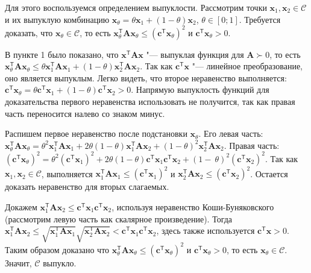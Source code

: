 \documentclass[a4paper,12pt]{article}
\begin{document}
\begin{enumerate}
		Для этого воспользуемся определением выпуклости. Рассмотрим точки $\mathbf{x}_1, \mathbf{x}_2 \in \mathcal{C}$ и их выпуклую комбинацию $\mathbf{x}_\theta = \theta \mathbf{x}_1 + (1-\theta) \mathbf{x}_2$, $\theta\in[0;1]$. Требуется доказать, что $\mathbf{x}_\theta \in \mathcal{C}$, то есть $\mathbf{x}_\theta^\mathsf{T} \mathbf{A} \mathbf{x}_\theta \leqslant (\mathbf{c}^\mathsf{T} \mathbf{x}_\theta)^2 $ и $\mathbf{c}^\mathsf{T} \mathbf{x}_\theta > 0$.
		
		В пункте 1 было показано, что $\mathbf{x}^\mathsf{T} \mathbf{A} \mathbf{x}$ "--- выпуклая функция для $\mathbf{A} \succ 0$, то есть $\mathbf{x}_\theta^\mathsf{T} \mathbf{A} \mathbf{x}_\theta \leqslant \theta \mathbf{x}_1^\mathsf{T} \mathbf{A} \mathbf{x}_1 + (1 - \theta) \mathbf{x}_2^\mathsf{T} \mathbf{A} \mathbf{x}_2$. Так как $ \mathbf{c}^\mathsf{T} \mathbf{x}$ "--- линейное преобразование, оно является выпуклым. Легко видеть, что второе неравенство выполняется: $\mathbf{c}^\mathsf{T} \mathbf{x}_\theta = \theta \mathbf{c}^\mathsf{T} \mathbf{x}_1 + (1-\theta) \mathbf{c}^\mathsf{T} \mathbf{x}_2> 0$. Напрямую выпуклость функций для доказательства первого неравенства использовать не получится, так как правая часть переносится налево со знаком минус.
		
		Распишем первое неравенство после подстановки $\mathbf{x}_\theta$. 
		Его левая часть: $\mathbf{x}_\theta^\mathsf{T} \mathbf{A} \mathbf{x}_\theta = \theta^2 \mathbf{x}_1^\mathsf{T} \mathbf{A} \mathbf{x}_1 + 2\theta (1-\theta) \mathbf{x}_1^\mathsf{T} \mathbf{A} \mathbf{x}_2 + (1-\theta)^2 \mathbf{x}_2^\mathsf{T} \mathbf{A} \mathbf{x}_2$. 
		Правая часть: $(\mathbf{c}^\mathsf{T} \mathbf{x}_\theta)^2 = \theta^2 (\mathbf{c}^\mathsf{T} \mathbf{x}_1)^2 + 2 \theta (1 - \theta) \mathbf{c}^\mathsf{T} \mathbf{x}_1 \mathbf{c}^\mathsf{T} \mathbf{x}_2 + (1-~\theta)^2 (\mathbf{c}^\mathsf{T} \mathbf{x}_2)^2$. 
		Так как $\mathbf{x}_1, \mathbf{x}_2 \in \mathcal{C}$, выполняется $\mathbf{x}_1^\mathsf{T} \mathbf{A} \mathbf{x}_1 \leqslant (\mathbf{c}^\mathsf{T} \mathbf{x}_1)^2$  и $\mathbf{x}_2^\mathsf{T} \mathbf{A} \mathbf{x}_2 \leqslant (\mathbf{c}^\mathsf{T} \mathbf{x}_2)^2$. Остается доказать неравенство для вторых слагаемых.
		
		Докажем $\mathbf{x}_1^\mathsf{T} \mathbf{A} \mathbf{x}_2 \leqslant  \mathbf{c}^\mathsf{T} \mathbf{x}_1 \mathbf{c}^\mathsf{T} \mathbf{x}_2$, используя неравенство Коши-Буняковского (рассмотрим левую часть как скалярное произведение). 
		Тогда $\mathbf{x}_1^\mathsf{T} \mathbf{A} \mathbf{x}_2 \leqslant \sqrt{\mathbf{x}_1^\mathsf{T} \mathbf{A} \mathbf{x}_1} \sqrt{\mathbf{x}_2^\mathsf{T} \mathbf{A} \mathbf{x}_2} < \mathbf{c}^\mathsf{T} \mathbf{x}_1 \mathbf{c}^\mathsf{T} \mathbf{x}_2$, здесь также используется $\mathbf{c}^\mathsf{T} \mathbf{x} > 0$. Таким образом доказано что $\mathbf{x}_\theta^\mathsf{T} \mathbf{A} \mathbf{x}_\theta \leqslant (\mathbf{c}^\mathsf{T} \mathbf{x}_\theta)^2 $ и $\mathbf{c}^\mathsf{T} \mathbf{x}_\theta > 0$, то есть $\mathbf{x}_\theta \in \mathcal{C}$. Значит, $\mathcal{C}$ выпукло.
				
	\end{enumerate}
	
\end{document}
